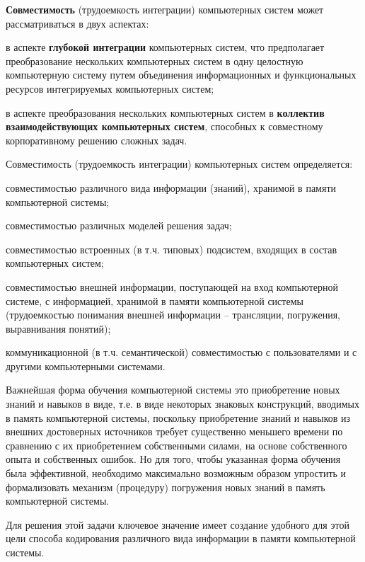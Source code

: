 \begin{SCn}
{\textbf{Совместимость} (трудоемкость интеграции) компьютерных систем может рассматриваться в двух аспектах:

\begin{scnitemize}
    \item в аспекте \textbf{глубокой интеграции} компьютерных систем, что предполагает преобразование нескольких компьютерных систем в одну целостную компьютерную систему путем объединения информационных и функциональных ресурсов интегрируемых компьютерных систем;
    \item в аспекте преобразования нескольких компьютерных систем в \textbf{коллектив взаимодействующих компьютерных систем}, способных к совместному корпоративному решению сложных задач.
\end{scnitemize}

Совместимость (трудоемкость интеграции) компьютерных систем определяется:
\begin{scnitemize}
    \item совместимостью различного вида информации (знаний), хранимой в памяти компьютерной системы;
    \item совместимостью различных моделей решения задач;
    \item совместимостью встроенных (в т.ч. типовых) подсистем, входящих в состав компьютерных систем;
    \item совместимостью внешней информации, поступающей на вход компьютерной системе, с информацией, хранимой в памяти компьютерной системы (трудоемкостью понимания внешней информации -- трансляции, погружения, выравнивания понятий);
    \item коммуникационной (в т.ч. семантической) совместимостью с пользователями и с другими компьютерными системами.
\end{scnitemize}

Важнейшая форма обучения компьютерной системы это приобретение новых знаний и навыков в  виде, т.е. в виде некоторых знаковых конструкций, вводимых в память компьютерной системы, поскольку приобретение знаний и навыков из внешних достоверных источников требует существенно меньшего времени по сравнению с их приобретением собственными силами, на основе собственного опыта и собственных ошибок. Но для того, чтобы указанная форма обучения была эффективной, необходимо максимально возможным образом упростить и формализовать механизм (процедуру) погружения новых знаний в память компьютерной системы.

Для решения этой задачи ключевое значение имеет создание удобного для этой цели способа кодирования различного вида информации в памяти компьютерной системы.

}
\end{SCn}
